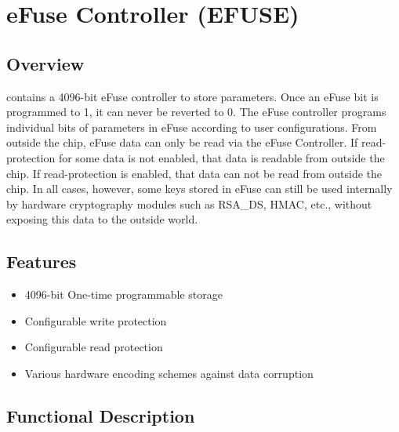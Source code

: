 \documentclass[main\_\_EN.tex]{subfiles}
\begin{document}

\ifglobal
\else
    {\let\clearpage\relax \listoftodos}
    \tableofcontents
\fi



\hypertarget{efuse}{}
\chapter{eFuse Controller (EFUSE)}
\label{mod:efuse}


\section{Overview}

\chipname{} contains a 4096-bit eFuse controller to store parameters. Once an eFuse bit is programmed to 1, it can never be reverted to 0. The eFuse controller programs individual bits of parameters in eFuse according to user configurations. From outside the chip, eFuse data can only be read via the eFuse Controller. If read-protection for some data is not enabled, that data is readable from outside the chip. If read-protection is enabled, that data can not be read from outside the chip. In all cases, however, some keys stored in eFuse can still be used internally by hardware cryptography modules such as RSA\_DS, HMAC, etc., without exposing this data to the outside world.

 \section{Features}

\begin{itemize}
    \item 4096-bit One-time programmable storage
    \item Configurable write protection
    \item Configurable read protection
    \item Various hardware encoding schemes against data corruption
\end{itemize}

\section{Functional Description}
\end{document}
